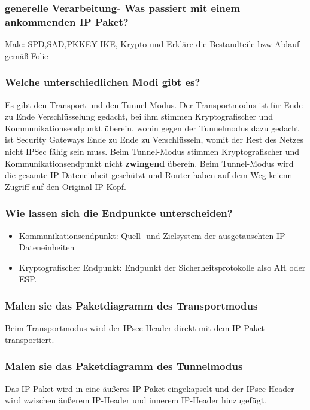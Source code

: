 	\subsubsection{generelle Verarbeitung- Was passiert mit einem ankommenden IP Paket?}
	Male: SPD,SAD,PK\textunderscore KEY IKE, Krypto und Erkläre die Bestandteile bzw Ablauf gemäß Folie %
	
	\subsubsection{Welche unterschiedlichen Modi gibt es?}
	Es gibt den Transport und den Tunnel Modus.
	Der Transportmodus ist für Ende zu Ende Verschlüsselung gedacht, bei ihm stimmen Kryptografischer und Kommunikationsendpunkt überein, wohin gegen der Tunnelmodus dazu gedacht ist Security Gateways Ende zu Ende zu Verschlüsseln, womit der Rest des Netzes nicht IPSec fähig sein muss. Beim Tunnel-Modus stimmen Kryptografischer und Kommunikationsendpunkt nicht \textbf{zwingend} überein. Beim Tunnel-Modus wird die gesamte IP-Dateneinheit geschützt und Router haben auf dem Weg keienn Zugriff auf den Original IP-Kopf.
	
	\subsubsection{Wie lassen sich die Endpunkte unterscheiden?}
	\begin{itemize}
		\item Kommunikationsendpunkt: Quell- und Zielsystem der ausgetauschten IP-Dateneinheiten
		\item Kryptografischer Endpunkt: Endpunkt der Sicherheitsprotokolle also AH oder ESP.
	\end{itemize}
			
	\subsubsection{Malen sie das Paketdiagramm des Transportmodus}

	Beim Transportmodus wird der IPsec Header direkt mit  dem IP-Paket transportiert.
	\subsubsection{Malen sie das Paketdiagramm des Tunnelmodus}

	Das IP-Paket wird in eine äußeres IP-Paket eingekapselt und der IPsec-Header wird zwischen äußerem IP-Header und innerem IP-Header hinzugefügt.
